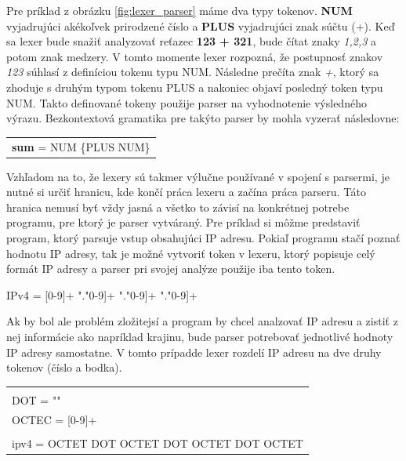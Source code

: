 Pre príklad z obrázku \ref{fig:lexer_parser}  máme dva typy tokenov. \textbf{NUM} vyjadrujúci akékoľvek prirodzené číslo a \textbf{PLUS} vyjadrujúci znak súčtu (+). Keď sa lexer bude snažiť analyzovať reťazec \textbf{123 + 321}, bude čítat znaky \textit{1,2,3} a potom znak medzery. V tomto momente lexer rozpozná, že postupnosť znakov \textit{123} súhlasí z definíciou tokenu typu NUM. Následne prečíta znak \textit{+}, ktorý sa zhoduje s druhým typom tokenu PLUS a nakoniec objaví posledný token typu NUM. Takto definované tokeny použije parser na vyhodnotenie výsledného výrazu. Bezkontextová gramatika pre takýto parser by mohla vyzerať následovne:

\begin{center}
\begin{tabular}{p{}}
\textbf{sum} = NUM \{PLUS NUM\}
\end{tabular}
\end{center}

Vzhľadom na to, že lexery sú takmer výlučne používané v spojení s parsermi, je nutné si určiť hranicu, kde končí práca lexeru a začína práca parseru. Táto hranica nemusí byť vždy jasná a všetko to závisí na konkrétnej potrebe programu, pre ktorý je parser vytváraný. Pre príklad si môžme predstaviť program, ktorý parsuje vstup obsahujúci IP adresu. Pokiaľ programu stačí poznať hodnotu IP adresy, tak je možné vytvoriť token v lexeru, ktorý popisuje celý formát IP adresy a parser pri svojej analýze použije iba tento token. 
\begin{center}
IPv4 = [0-9]+ "."\text{ [}0-9]+ "."\text{ [}0-9]+ "."\text{ [}0-9]+
\end{center}

Ak by bol ale problém zložitejsí a program by chcel analzovať IP adresu a zistiť z nej informácie ako napríklad krajinu, bude parser potrebovať jednotlivé hodnoty IP adresy samostatne. V tomto prípadde lexer rozdelí IP adresu na dve druhy tokenov (číslo a bodka).

\begin{center}
\begin{tabular}{p{}}
\color{editorGray}{/* Lexer */}\\
DOT   = "\text{.}"\\
OCTEC = [0-9]+\\
\color{editorGray}{/* Parser */}\\
ipv4  = OCTET DOT OCTET DOT OCTET DOT OCTET
\end{tabular}
\end{center}
